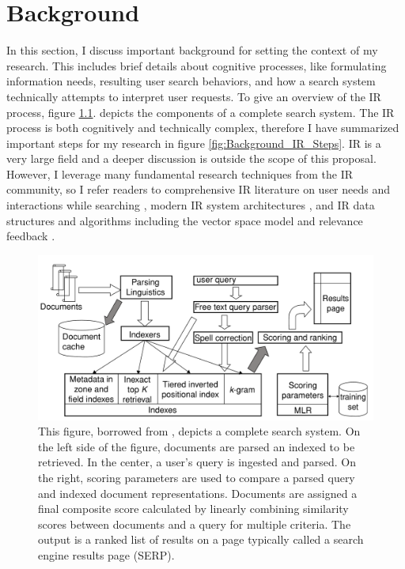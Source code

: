 \chapter{Background} \label{ch:[chapter 2 label]}

In this section, I discuss important background for setting the context of my research. This includes brief details about cognitive processes, like formulating information needs, resulting user search behaviors, and how a search system technically attempts to interpret user requests. To give an overview of the IR process, figure \ref{fig:Background_Complete_Search_System}. depicts the components of a complete search system. The IR  process is both cognitively and technically complex, therefore I have summarized important steps for my research in figure \ref{fig:Background_IR_Steps}. IR is a very large field and a deeper discussion is outside the scope of this proposal. However, I leverage many fundamental research techniques from the IR community, so I refer readers to comprehensive IR literature on user needs and interactions while searching \cite{White2016}, modern IR system architectures \cite{Baeza-Yates1999}, and IR data structures and algorithms including the vector space model and relevance feedback \cite{Buckley1985}.


\begin{figure}
    \centering
    \includegraphics[width=1\textwidth]{../figures/Background_Complete_Search_System.png}
    \caption{This figure, borrowed from \cite{Manning2008}, depicts a complete search system. On the left side of the figure, documents are parsed an indexed to be retrieved. In the center, a user’s query is ingested and parsed. On the right, scoring parameters are used to compare a parsed query and indexed document representations. Documents are assigned a final composite score calculated by linearly combining similarity scores between documents and a query for multiple criteria. The output is a ranked list of results on a page typically called a search engine results page (SERP).}
    \label{fig:Background_Complete_Search_System}
\end{figure}

